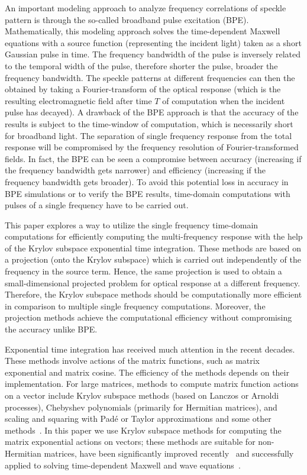 \documentclass[11pt]{elsarticle}
\begin{document}
An important modeling approach to analyze frequency correlations of speckle 
pattern is through the so-called broadband pulse excitation (BPE).
Mathematically, this modeling approach solves the time-dependent
Maxwell equations with a source function (representing
the incident light) taken as a short Gaussian pulse in time. The frequency 
bandwidth of the pulse is inversely related to the temporal width of the pulse, 
therefore shorter the pulse, broader the frequency bandwidth. The speckle
patterns at different frequencies can then the obtained by taking a 
Fourier-transform of the optical response (which
is the resulting electromagnetic field after time $T$ of computation when the 
incident pulse has decayed).
A drawback of the BPE approach is that the accuracy of the results is subject 
to the time-window of computation, which is necessarily short for broadband 
light.  The separation of single frequency response from the total response 
will be compromised by the frequency resolution of Fourier-transformed fields. 
In fact, the BPE can be seen a compromise between accuracy 
(increasing if the frequency bandwidth gets narrower) and
efficiency (increasing if the frequency bandwidth gets broader).
To avoid this potential loss in accuracy in BPE simulations or to verify the 
BPE results, time-domain computations
with pulses of a single frequency have to be carried out.

This paper explores a way to utilize the single frequency time-domain 
computations for efficiently computing the multi-frequency response with the 
help of the Krylov subspace exponential time integration. These methods are 
based on a projection (onto the Krylov subspace) which is carried out 
independently of the frequency in the source term. Hence, the same projection 
is used to obtain a small-dimensional projected problem for optical response at 
a different frequency. Therefore, the Krylov subspace methods should be 
computationally more efficient in comparison to multiple single frequency 
computations. Moreover, the projection methods achieve the computational 
efficiency without compromising the accuracy unlike BPE. 

Exponential time integration has received much attention in the recent
decades. These methods involve actions of the matrix functions,
such as matrix exponential and matrix cosine. The efficiency of the methods
depends on their implementation.  
For large matrices, methods to compute matrix function actions
on a vector include Krylov subspace methods (based on Lanczos or Arnoldi
processes), Chebyshev polynomials (primarily for Hermitian
matrices),
and scaling and squaring with Pad\'e or Taylor 
approximations and some other 
methods~\cite{TalEzer89,DeRaedt03,SchmelzerTrefethen07,CaliariOstermann09,%
AlmohyHigham2011}.
In this paper we use Krylov subspace methods for computing
the matrix exponential actions on vectors; these methods
are suitable for non-Hermitian matrices,
have been significantly improved 
recently~\cite{DruskinKnizh98,MoretNovati04,EshofHochbruck06,PhD_Guettel} 
and successfully applied to solving time-dependent Maxwell
and wave 
equations~\cite{DruskinRemis2013,BornerErnstGuettel2015,%
Hochbruck_Pazur_ea2015,Botchev2016}.
\end{document}
